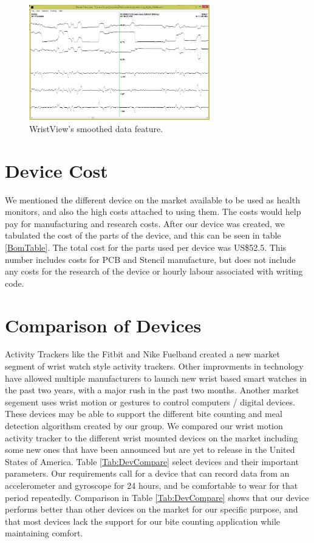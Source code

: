 \begin{figure}
\begin{center}
\includegraphics[width=0.7\textwidth]{images/WristView.jpg}
\caption{WristView's smoothed data feature.}
\label{Fig:WristViewSmooth}
\end{center}
\end{figure}

\section{Device Cost}
\label{Sec:DevCost}
We mentioned the different device on the market available to be used as health monitors,
and also the high costs attached to using them.
The costs would help pay for manufacturing and research costs.
After our device was created, 
we tabulated the cost of the parts of the device, and this can be seen in table \ref{BomTable}.
The total cost for the parts used per device was US\$52.5.
This number includes costs for PCB and Stencil manufacture, but does not include any costs for the research of the device or hourly labour associated with writing code.


\section{Comparison of Devices}
\label{Sec:Comparison}
Activity Trackers like the Fitbit and Nike Fuelband created a new market segment of
wrist watch style activity trackers.
Other improvments in technology have allowed multiple manufacturers to launch new
wrist based smart watches in the past two years,
with a major rush in the past two months.
Another market segement uses wrist motion or gestures to control computers / digital devices.
These devices may be able to support the different bite counting and meal detection algorithsm created by our group.
We compared our wrist motion activity tracker to the different wrist mounted devices on the market
including some new ones that have been announced but are yet to release in the United States of America.
Table \ref{Tab:DevCompare} select devices and their important parameters.
Our requirements call for a device that can record data from an accelerometer and gyroscope for 24 hours,
and be comfortable to wear for that period repeatedly. Comparison in Table \ref{Tab:DevCompare} shows that our device performs better than other devices on the market for our specific purpose, and that most devices lack the support for our bite counting application while maintaining comfort.

